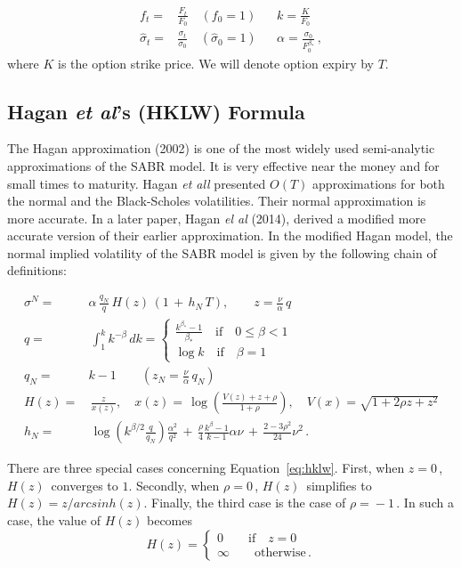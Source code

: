 \documentclass[12pt,oneside]{article}
\newcommand{\beqn}{\begin{equation}}
\newcommand{\eeqn}{\end{equation}}
\numberwithin{equation}{section}
\begin{document}
\beqn
\begin{aligned}
    f_t =&\frac{F_t}{F_0}\quad(f_0=1)&&k=\frac{K}{F_0}\\
    \hat{\sigma}_t=&\frac{\sigma_t}{\sigma_0}\quad(\hat{\sigma}_0=1)&&
    \alpha = \frac{\sigma_0}{F_0^{\beta_*}}\,,
\end{aligned}
\eeqn
where $K$ is the option strike price.
We will denote option expiry by $T$.

\subsection{Hagan {\em et al}'s (HKLW) Formula}
The Hagan approximation (2002)\cite{HKLW} is one of the most widely used
semi-analytic approximations of the SABR model.
It is very effective near the money and for small times to maturity.
Hagan {\em et all} presented $O(T)$ approximations for both the normal and the
Black-Scholes volatilities.
Their normal approximation is more accurate.
In a later paper, Hagan {\em el al} (2014)\cite{HKLW1},
derived a modified more accurate version of their earlier approximation.
In the modified Hagan model, the normal implied volatility of the SABR model
is given by the following chain of definitions:

\beqn\label{eq:hklw}
\begin{aligned}
\sigma^N=&\alpha\,\frac{q_N}{q}\,H(z)\,(1\,+\,h_N\,T),\quad\quad
z=\frac{\nu}{\alpha}\,q\\
q=&\,\int_1^kk^{-\beta}\,dk=
\begin{cases}
    \frac{k^{\beta_*}-1}{\beta_*}\quad\text{if}\quad 0\le\beta<1\\
    \log k\quad\text{if}\quad \beta=1
\end{cases}\\
q_N=&k-1\quad\quad(z_N=\frac{\nu}{\alpha}\,q_N)\\
H(z)=&\,\frac{z}{x(z)},\quad x(z)=\,\log\left(\frac{V(z)+z+\rho}{1+\rho}\right),
\quad V(x)=\sqrt{1+2\rho z+z^2}\\[5pt]
h_N=&\,\log\left(k^{\beta/2}\frac{q}{q_N}\right)\frac{\alpha^2}{q^2}\,+\,
\frac{\rho}{4}\frac{k^\beta-1}{k-1}\alpha \nu \,+\,
\frac{2-3\rho^2}{24}\nu^2\,.
\end{aligned}
\eeqn

There are three special cases concerning Equation~\eqref{eq:hklw}.
First, when $z\!=\!0\,$, $H(z)\,$ converges to $1$.
Secondly, when $\rho\!=\!0\,$, $H(z)\,$ simplifies to $H(z)\!=\!z/arcsinh(z)$.
Finally, the third case is the case of $\rho\!=\!-1\,$.
In such a case,
the value of $H(z)$ becomes
\beqn
H(z)=
\begin{cases}
    0\quad\quad\text{if}\quad z=0\\
    \infty\quad\quad\text{otherwise}\,.
\end{cases}
\eeqn
\end{document}
